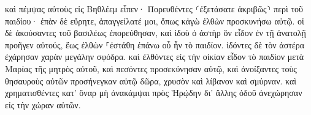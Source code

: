 \documentclass{openreader}
\begin{document}
καὶ πέμψας αὐτοὺς εἰς Βηθλέεμ εἶπεν· Πορευθέντες ⸂ἐξετάσατε ἀκριβῶς⸃ περὶ τοῦ παιδίου· ἐπὰν δὲ εὕρητε, ἀπαγγείλατέ μοι, ὅπως κἀγὼ ἐλθὼν προσκυνήσω αὐτῷ. 
οἱ δὲ ἀκούσαντες τοῦ βασιλέως ἐπορεύθησαν, καὶ ἰδοὺ ὁ ἀστὴρ ὃν εἶδον ἐν τῇ ἀνατολῇ προῆγεν αὐτούς, ἕως ἐλθὼν ⸀ἐστάθη ἐπάνω οὗ ἦν τὸ παιδίον. 
ἰδόντες δὲ τὸν ἀστέρα ἐχάρησαν χαρὰν μεγάλην σφόδρα. 
καὶ ἐλθόντες εἰς τὴν οἰκίαν εἶδον τὸ παιδίον μετὰ Μαρίας τῆς μητρὸς αὐτοῦ, καὶ πεσόντες προσεκύνησαν αὐτῷ, καὶ ἀνοίξαντες τοὺς θησαυροὺς αὐτῶν προσήνεγκαν αὐτῷ δῶρα, χρυσὸν καὶ λίβανον καὶ σμύρναν. 
καὶ χρηματισθέντες κατ’ ὄναρ μὴ ἀνακάμψαι πρὸς Ἡρῴδην δι’ ἄλλης ὁδοῦ ἀνεχώρησαν εἰς τὴν χώραν αὐτῶν. 
\end{document}
